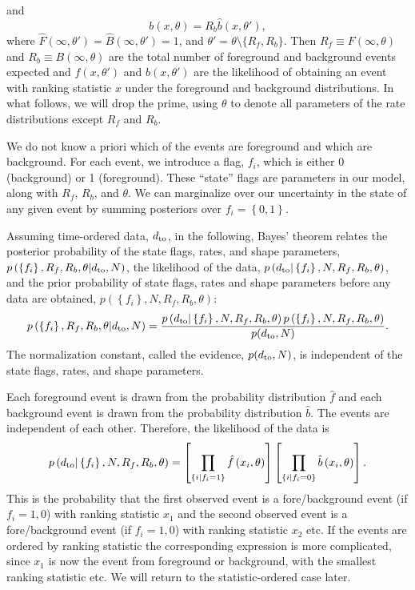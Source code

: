 \documentclass[aps,prd]{revtex4-1}
\newcommand{\mathset}[1]{\left\{ #1 \right\}}
\begin{document}
and
\begin{equation}
  b(x, \theta) = R_b \hat{b}(x, \theta'),
\end{equation}
where $\hat{F}(\infty, \theta') = \hat{B}(\infty, \theta') = 1$, and
$\theta' = \theta \setminus \{R_{f}, R_{b} \}$.  Then $R_f \equiv
F(\infty,\theta)$ and $R_b \equiv B(\infty,\theta)$ are the total
number of foreground and background events expected and $\hat{f}(x,
\theta')$ and $\hat{b}(x, \theta')$ are the likelihood of obtaining an
event with ranking statistic $x$ under the foreground and background
distributions.  In what follows, we will drop the prime, using
$\theta$ to denote all parameters of the rate distributions except
$R_f$ and $R_b$.

We do not know a priori which of the events are foreground and which
are background.  For each event, we introduce a flag, $f_i$, which is
either 0 (background) or 1 (foreground).  These ``state'' flags are
parameters in our model, along with $R_f$, $R_b$, and $\theta$.  We
can marginalize over our uncertainty in the state of any given event
by summing posteriors over $f_i = \mathset{0,1}$.

Assuming time-ordered data, $d_{\rm to}$, in the following, Bayes'
theorem relates the posterior probability of the state flags, rates,
and shape parameters, $p\left(\mathset{f_i}, R_f, R_b, \theta | d_{\rm
  to}, N \right)$, the likelihood of the data, $p\left( d_{\rm to} |
\mathset{f_i}, N, R_f, R_b, \theta\right)$, and the prior probability
of state flags, rates and shape parameters before any data are
obtained, $p\left( \mathset{f_i}, N, R_f, R_b, \theta\right)$:
\begin{equation}
  \label{eq:Bayes}
  p\left(\mathset{f_i}, R_f, R_b, \theta | d_{\rm to}, N \right) =
  \frac{p\left( d_{\rm to} | \mathset{f_i}, N, R_f, R_b, \theta\right)
    p\left(\mathset{f_i}, N, R_f, R_b, \theta\right)}{p(d_{\rm to},
    N)}.
\end{equation}
The normalization constant, called the evidence, $p(d_{\rm to}, N)$,
is independent of the state flags, rates, and shape parameters.

Each foreground event is drawn from the probability distribution
$\hat{f}$ and each background event is drawn from the probability
distribution $\hat{b}$.  The events are independent of each other.
Therefore, the likelihood of the data is
\begin{equation}
  p\left( d_{\rm to} | \mathset{f_i}, N, R_f, R_b, \theta\right) =
  \left[ \prod_{\mathset{i | f_i = 1}} \hat{f}\left(x_i, \theta\right)
    \right] \left[ \prod_{\mathset{i | f_i = 0}} \hat{b}\left( x_i,
    \theta\right) \right].
\end{equation}
This is the probability that the first observed event is a
fore/background event (if $f_i=1,0$) with ranking statistic $x_1$ and
the second observed event is a fore/background event (if $f_i=1,0$)
with ranking statistic $x_2$ etc. If the events are ordered by ranking
statistic the corresponding expression is more complicated, since
$x_1$ is now the event from foreground or background, with the
smallest ranking statistic etc. We will return to the
statistic-ordered case later.
\end{document}
